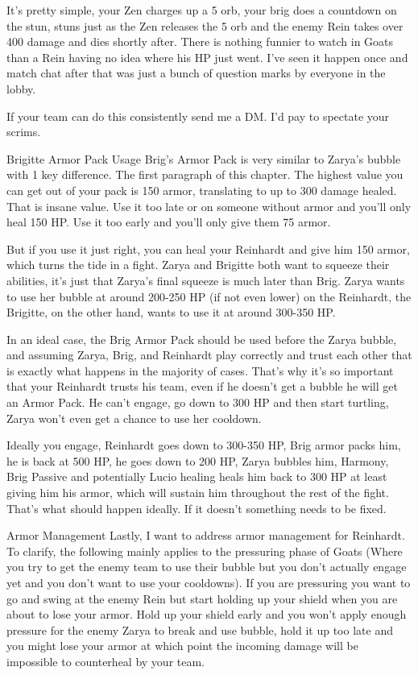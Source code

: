 It’s pretty simple, your Zen charges up a 5 orb, your brig does a countdown on the stun, stuns just as the Zen releases the 5 orb and the enemy Rein takes over 400 damage and dies shortly after. There is nothing funnier to watch in Goats than a Rein having no idea where his HP just went. I’ve seen it happen once and match chat after that was just a bunch of question marks by everyone in the lobby.

If your team can do this consistently send me a DM. I’d pay to spectate your scrims.

Brigitte Armor Pack Usage
Brig’s Armor Pack is very similar to Zarya’s bubble with 1 key difference. The first paragraph of this chapter. The highest value you can get out of your pack is 150 armor, translating to up to 300 damage healed. That is insane value. Use it too late or on someone without armor and you’ll only heal 150 HP. Use it too early and you’ll only give them 75 armor.

But if you use it just right, you can heal your Reinhardt and give him 150 armor, which turns the tide in a fight. Zarya and Brigitte both want to squeeze their abilities, it’s just that Zarya’s final squeeze is much later than Brig. Zarya wants to use her bubble at around 200-250 HP (if not even lower) on the Reinhardt, the Brigitte, on the other hand, wants to use it at around 300-350 HP.

In an ideal case, the Brig Armor Pack should be used before the Zarya bubble, and assuming Zarya, Brig, and Reinhardt play correctly and trust each other that is exactly what happens in the majority of cases. That’s why it’s so important that your Reinhardt trusts his team, even if he doesn’t get a bubble he will get an Armor Pack. He can’t engage, go down to 300 HP and then start turtling, Zarya won’t even get a chance to use her cooldown.

Ideally you engage, Reinhardt goes down to 300-350 HP, Brig armor packs him, he is back at 500 HP, he goes down to 200 HP, Zarya bubbles him, Harmony, Brig Passive and potentially Lucio healing heals him back to 300 HP at least giving him his armor, which will sustain him throughout the rest of the fight. That’s what should happen ideally. If it doesn’t something needs to be fixed. 

Armor Management
Lastly, I want to address armor management for Reinhardt. To clarify, the following mainly applies to the pressuring phase of Goats (Where you try to get the enemy team to use their bubble but you don’t actually engage yet and you don’t want to use your cooldowns).
If you are pressuring you want to go and swing at the enemy Rein but start holding up your shield when you are about to lose your armor. Hold up your shield early and you won't apply enough pressure for the enemy Zarya to break and use bubble, hold it up too late and you might lose your armor at which point the incoming damage will be impossible to counterheal by your team.

